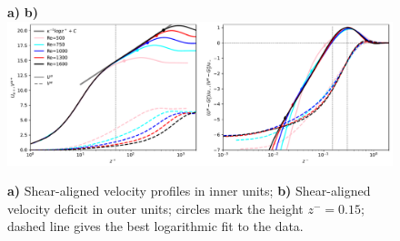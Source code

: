 \documentclass[a4paper,11pt]{amsart}
\begin{document}
\begin{figure}
  \begin{flushleft}
    \textbf{a)}\hspace{0.47\textwidth} \textbf{b)}\\
    \includegraphics[width=\textwidth]{../plot/uv_innerouter.pdf}\\
    \caption{
      \textbf{a)} Shear-aligned velocity profiles in inner units;
      \textbf{b)} Shear-aligned velocity deficit in outer units; circles mark the
      height $z^-=0.15$; dashed line gives the best logarithmic fit to the data. 
      \label{fig:profiles}
    }
  \end{flushleft}
\end{figure}
\end{document}

